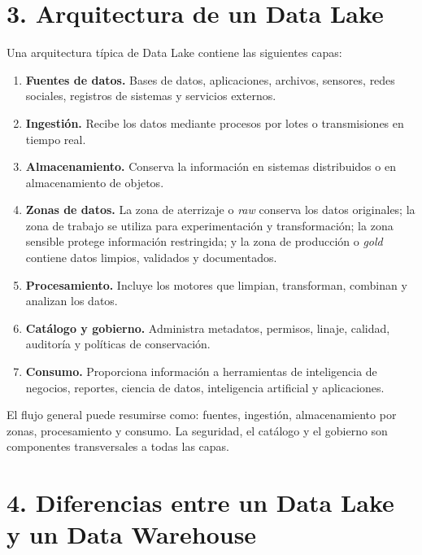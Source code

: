 \section*{3. Arquitectura de un Data Lake}

Una arquitectura típica de Data Lake contiene las siguientes capas:

\begin{enumerate}
    \item \textbf{Fuentes de datos.} Bases de datos, aplicaciones, archivos,
    sensores, redes sociales, registros de sistemas y servicios externos.

    \item \textbf{Ingestión.} Recibe los datos mediante procesos por lotes o
    transmisiones en tiempo real.

    \item \textbf{Almacenamiento.} Conserva la información en sistemas
    distribuidos o en almacenamiento de objetos.

    \item \textbf{Zonas de datos.} La zona de aterrizaje o \textit{raw}
    conserva los datos originales; la zona de trabajo se utiliza para
    experimentación y transformación; la zona sensible protege información
    restringida; y la zona de producción o \textit{gold} contiene datos
    limpios, validados y documentados.

    \item \textbf{Procesamiento.} Incluye los motores que limpian,
    transforman, combinan y analizan los datos.

    \item \textbf{Catálogo y gobierno.} Administra metadatos, permisos,
    linaje, calidad, auditoría y políticas de conservación.

    \item \textbf{Consumo.} Proporciona información a herramientas de
    inteligencia de negocios, reportes, ciencia de datos, inteligencia
    artificial y aplicaciones.
\end{enumerate}

El flujo general puede resumirse como: fuentes, ingestión, almacenamiento por
zonas, procesamiento y consumo. La seguridad, el catálogo y el gobierno son
componentes transversales a todas las capas.

\section*{4. Diferencias entre un Data Lake y un Data Warehouse}

